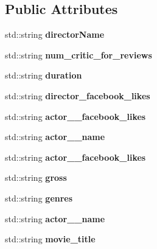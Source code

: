 \subsection*{Public Attributes}
\begin{DoxyCompactItemize}
\item 
\mbox{\label{classmovie_a2f4edea72af36ec414130d46ecdd63fc}} 
std\+::string {\bfseries director\+Name}
\item 
\mbox{\label{classmovie_a279abb262ba7e9143781de9216929cd8}} 
std\+::string {\bfseries num\+\_\+critic\+\_\+for\+\_\+reviews}
\item 
\mbox{\label{classmovie_a7ba3745713e6751a062a0a67bafc923a}} 
std\+::string {\bfseries duration}
\item 
\mbox{\label{classmovie_ad786b7301b2eac2e1455234f62ef7887}} 
std\+::string {\bfseries director\+\_\+facebook\+\_\+likes}
\item 
\mbox{\label{classmovie_a6c8dc5edf96acb991f94d5b29ee50a11}} 
std\+::string {\bfseries actor\+\_\+\_\+facebook\+\_\+likes}
\item 
\mbox{\label{classmovie_afbb5e9100939ed347748fe4171f68fd4}} 
std\+::string {\bfseries actor\+\_\+\_\+name}
\item 
\mbox{\label{classmovie_ac5ffaccb8fdd19ac4131d6a0324ba9a6}} 
std\+::string {\bfseries actor\+\_\+\_\+facebook\+\_\+likes}
\item 
\mbox{\label{classmovie_a84c02e9a63f05d443288dcd8e8e823ae}} 
std\+::string {\bfseries gross}
\item 
\mbox{\label{classmovie_aaa9369b0613db267a90410556dfca194}} 
std\+::string {\bfseries genres}
\item 
\mbox{\label{classmovie_af58fd6178b145bdfaf21c8f50e54a650}} 
std\+::string {\bfseries actor\+\_\+\_\+name}
\item 
\mbox{\label{classmovie_aa120e55dd4fe65e378d8a5b9011217d2}} 
std\+::string {\bfseries movie\+\_\+title}

\end{DoxyCompactItemize}
